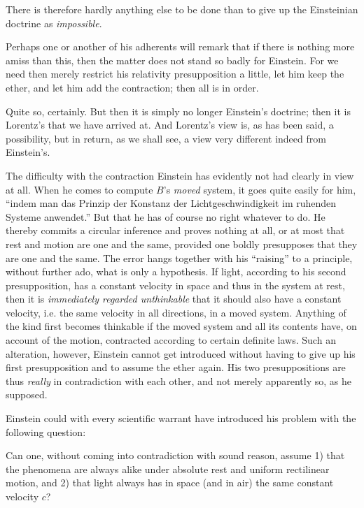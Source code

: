 \documentclass[12pt,a4paper]{article}
\begin{document}
There is therefore hardly anything else to be done than to give up the
Einsteinian doctrine as \emph{impossible}.

Perhaps one or another of his adherents will remark that if there is nothing
more amiss than this, then the matter does not stand so badly for Einstein.
For we need then merely restrict his relativity presupposition a little, let
him keep the ether, and let him add the contraction; then all is in order.

Quite so, certainly. But then it is simply no longer Einstein's doctrine; then
it is Lorentz's that we have arrived at. And Lorentz's view is, as has been
said, a possibility, but in return, as we shall see, a view very different
indeed from Einstein's.

The difficulty with the contraction Einstein has evidently not had clearly in
view at all. When he comes to compute $B$'s \emph{moved} system, it goes quite
easily for him, ``indem man das Prinzip der Konstanz der Lichtgeschwindigkeit
im ruhenden Systeme anwendet.'' But that he has of course no right whatever to
do. He thereby commits a circular inference and proves nothing at all, or at
most that rest and motion are one and the same, provided one boldly
presupposes that they are one and the same. The error hangs together with his
``raising'' to a principle, without further ado, what is only a hypothesis. If
light, according to his second presupposition, has a constant velocity in
space and thus in the system at rest, then it is \emph{immediately regarded
unthinkable} that it should also have a constant velocity, i.e. the same
velocity in all directions, in a moved system. Anything of the kind first
becomes thinkable if the moved system and all its contents have, on account of
the motion, contracted according to certain definite laws. Such an alteration,
however, Einstein cannot get introduced without having to give up his first
presupposition and to assume the ether again. His two presuppositions are thus
\emph{really} in contradiction with each other, and not merely apparently so,
as he supposed.

Einstein could with every scientific warrant have introduced his problem with
the following question:

Can one, without coming into contradiction with sound reason, assume 1) that
the phenomena are always alike under absolute rest and uniform rectilinear
motion, and 2) that light always has in space (and in air) the same constant
velocity $c$?
\end{document}
